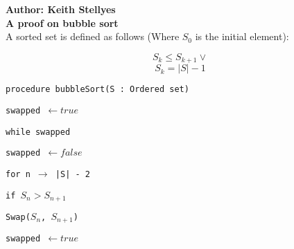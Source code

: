 \documentclass{article}
\begin{document}
	
\textbf{\LARGE Author: Keith Stellyes}\\

\textbf{\Large A proof on bubble sort}\\


A sorted set is defined as follows (Where $S_{0}$ is the initial element): 

$$S_{k} \leq S_{k + 1} \vee$$ 
$$S_{k} = |S| - 1$$

\texttt{procedure bubbleSort(S : Ordered set)}

\qquad\texttt{swapped $\leftarrow true$}

\qquad\texttt{while swapped}

\qquad\qquad\texttt{swapped $\leftarrow false$}

\qquad\qquad\texttt{for n $\rightarrow$ |S| - 2}

\qquad\qquad\qquad\texttt{if $S_{n} >  S_{n + 1}$}

\qquad\qquad\qquad\qquad\texttt{Swap($S_{n}$, $S_{n + 1}$)}

\qquad\qquad\qquad\qquad\texttt{swapped $\leftarrow true$}
\end{document}
